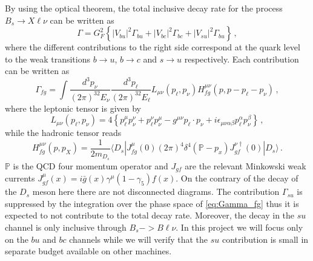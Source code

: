 By using the optical theorem, the total inclusive decay rate for the
process $B_s \to X\ell\nu$ can be written as
\begin{equation}
  \Gamma = G^2_F\left\{ |V_{bu} |^2 \Gamma_{bu} + |V_{bc} |^2 \Gamma_{bc} + |V_{su} |^2 \Gamma_{bu}
  \right\}\,,
\end{equation}
where the different contributions to the right side correspond at the quark level
to the weak transitions $b \to u$, $b \to c$ and $s \to u$ respectively. Each contribution can be written as
\begin{equation}\label{eq:Gamma_fg}
  \Gamma_{fg}=\int \frac{d^3p_\nu}{(2\pi)^32E_\nu}\frac{d^3p_\ell}{(2\pi)^32E_\ell}
  L_{\mu\nu}(p_\ell, p_\nu) H^{\mu\nu}_{fg}(p,p-p_\ell-p_\nu)\,,
\end{equation}
where the leptonic tensor is given by
\begin{equation}
  L_{\mu\nu}(p_\ell, p_\nu) =4\left\{p_\ell^\mu p_\nu^\nu +p_\ell^\nu
  p_\nu^\mu - g^{\mu\nu} p_\ell\cdot p_\nu+
  i\epsilon_{\mu\nu\alpha\beta} p_\ell^\alpha p_\nu^\beta\right\}\,,
\end{equation}
while the hadronic tensor reads
\begin{equation}
  H^{\mu\nu}_{fg}(p,p_X)=\frac{1}{2m_{D_s}}\langle D_s| J^\mu_{fg}(0)(2\pi)^4
  \delta^4(\mathbb{P}-p_x) J^{\nu\dagger}_{gf} (0)| D_s\rangle\,.
\end{equation}
$\mathbb{P}$ is the QCD four momentum operator and $J_{gf}$ are the
relevant Minkowski weak currents $J_{gf}^\mu(x)=i\bar
  g(x)\gamma^\mu(1-\gamma_5)f(x)$.
On the contrary of the decay of the $D_s$ meson here there are not disconnected
diagrams. The contribution $\Gamma_{su}$ is suppressed by the integration over
the phase space of \eqref{eq:Gamma_fg} thus it is expected to not contribute to the total
decay rate. Moreover, the decay in the $su$ channel is only inclusive through $B_s-> B\ell\nu$.
In this project we will focus only on the $bu$ and $bc$ channels while we will verify
that the $su$ contribution is small in separate budget available on other machines.

